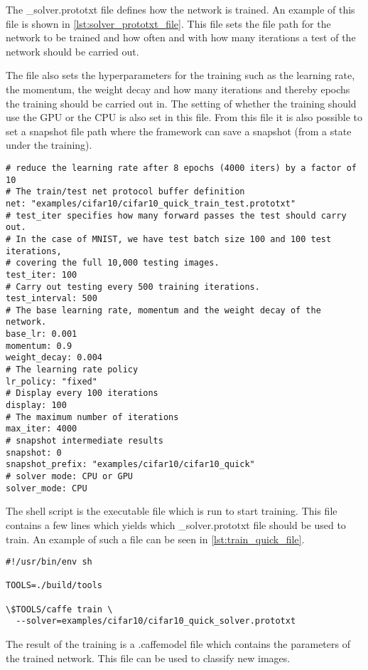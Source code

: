The \_solver.prototxt file defines how the network is trained. An example of this file is shown in \autoref{lst:solver_prototxt_file}. This file sets the file path for the network to be trained and how often and with how many iterations a test of the network should be carried out.

The file also sets the hyperparameters for the training such as the learning
rate, the momentum, the weight decay and how many iterations and thereby epochs the training should be carried out in. The setting of whether the training should use the GPU or the CPU is also set in this file. From this file it is also possible to set a snapshot file path where the framework can save a snapshot (from a state under the training).

\begin{lstlisting}[caption = The code from the cifar10\_quick\_solver.prototxt from  the Cifar-10 tutorial provided by the framework. This file defines the hyperparameters for the training of the network., label={lst:solver_prototxt_file}]
# reduce the learning rate after 8 epochs (4000 iters) by a factor of 10
# The train/test net protocol buffer definition
net: "examples/cifar10/cifar10_quick_train_test.prototxt"
# test_iter specifies how many forward passes the test should carry out.
# In the case of MNIST, we have test batch size 100 and 100 test iterations,
# covering the full 10,000 testing images.
test_iter: 100
# Carry out testing every 500 training iterations.
test_interval: 500
# The base learning rate, momentum and the weight decay of the network.
base_lr: 0.001
momentum: 0.9
weight_decay: 0.004
# The learning rate policy
lr_policy: "fixed"
# Display every 100 iterations
display: 100
# The maximum number of iterations
max_iter: 4000
# snapshot intermediate results
snapshot: 0
snapshot_prefix: "examples/cifar10/cifar10_quick"
# solver mode: CPU or GPU
solver_mode: CPU
\end{lstlisting}

The shell script is the executable file which is run to start training. This
file contains a few lines which yields which \_solver.prototxt file should be used to train. An example of such a file can be seen in \autoref{lst:train_quick_file}.

\begin{lstlisting}[caption = The code from the train\_quick.sh file from  the Cifar-10 tutorial provided by the framework. This file is executable and yields which \_solver.prototxt file to us to start training., label={lst:train_quick_file}]
#!/usr/bin/env sh

TOOLS=./build/tools

\$TOOLS/caffe train \
  --solver=examples/cifar10/cifar10_quick_solver.prototxt
\end{lstlisting}

The result of the training is a .caffemodel file which contains the parameters of the trained network. This file can be used to classify new images.

